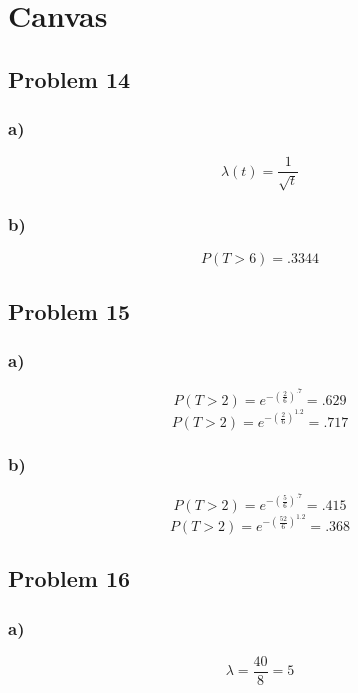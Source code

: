 \documentclass{article}
\begin{document}
\section*{Canvas}
\subsection*{Problem 14}
\subsubsection*{a)}
\begin{equation}
    \lambda(t) = \frac{1}{\sqrt{t}}
\end{equation}
\subsubsection*{b)}
\begin{equation}
    P(T > 6) = .3344
\end{equation}
\subsection*{Problem 15}
\subsubsection*{a)}
\begin{equation}
    P(T > 2) = e^{-(\frac{2}{6})^{.7}} = .629
\end{equation}
\begin{equation}
    P(T > 2) = e^{-(\frac{2}{6})^{1.2}} = .717
\end{equation}
\subsubsection*{b)}
\begin{equation}
    P(T > 2) = e^{-(\frac{5}{6})^{.7}} = .415
\end{equation}
\begin{equation}
    P(T > 2) = e^{-(\frac{52}{6})^{1.2}} = .368
\end{equation}
\subsection*{Problem 16}
\subsubsection*{a)}
\begin{equation}
    \lambda = \frac{40}{8} = 5
\end{equation}
\end{document}
